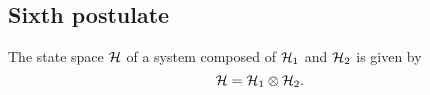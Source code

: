     \subsection{Sixth postulate}
    \begin{postulate}
        The state space $\mathcal{H}$ of a system composed of $\mathcal{H}_1$ and $\mathcal{H}_2$ is given by
        \begin{equation*}
            \mathcal{H}=\mathcal{H}_1\otimes\mathcal{H}_2.
        \end{equation*}
        \label{post:6}
    \end{postulate}
